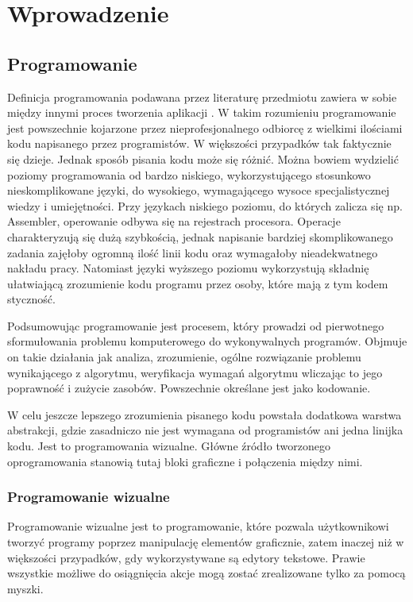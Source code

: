 \chapter{Wprowadzenie}
\label{c1}

\section{Programowanie}
\label{c11}

Definicja programowania podawana przez literaturę przedmiotu zawiera w sobie między innymi proces tworzenia aplikacji . W takim rozumieniu programowanie jest powszechnie kojarzone przez nieprofesjonalnego odbiorcę  z wielkimi ilościami kodu napisanego przez programistów. W większości przypadków tak faktycznie się dzieje. Jednak sposób pisania kodu może się różnić. Można bowiem wydzielić poziomy programowania od bardzo niskiego, wykorzystującego stosunkowo nieskomplikowane języki, do wysokiego, wymagającego wysoce specjalistycznej wiedzy i umiejętności. Przy językach niskiego poziomu, do których zalicza się np. Assembler, operowanie odbywa się na rejestrach procesora. Operacje charakteryzują się dużą szybkością, jednak napisanie bardziej skomplikowanego zadania zajęłoby ogromną ilość linii kodu oraz wymagałoby nieadekwatnego nakładu pracy. Natomiast języki wyższego poziomu wykorzystują składnię ułatwiającą zrozumienie kodu programu przez osoby, które mają z tym kodem styczność. 

Podsumowując programowanie jest procesem, który prowadzi od pierwotnego sformułowania problemu komputerowego do wykonywalnych programów. Objmuje on takie działania jak analiza, zrozumienie, ogólne rozwiązanie problemu wynikającego z algorytmu, weryfikacja wymagań algorytmu wliczając to jego poprawność i zużycie zasobów. Powszechnie określane jest jako kodowanie.\cite{android:64}\cite{android:65}

W celu jeszcze lepszego zrozumienia pisanego kodu powstała dodatkowa warstwa abstrakcji, gdzie zasadniczo nie jest wymagana od programistów ani jedna linijka kodu. Jest to programowania wizualne. Główne źródło tworzonego oprogramowania stanowią tutaj bloki graficzne i połączenia między nimi. 


\subsection{Programowanie wizualne}
\label{c111}


Programowanie wizualne jest to programowanie, które pozwala użytkownikowi tworzyć programy poprzez manipulację elementów graficznie, zatem inaczej niż w większości przypadków, gdy wykorzystywane są edytory tekstowe. Prawie wszystkie możliwe do osiągnięcia akcje mogą zostać zrealizowane tylko za pomocą myszki. 

